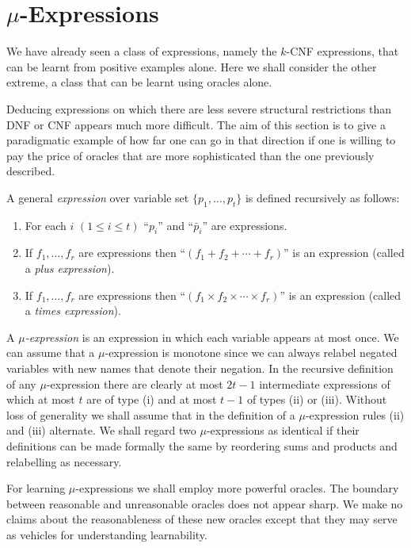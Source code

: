 \section{$\mu$-Expressions}

We have already seen a class of expressions, namely the $k$-CNF expressions, that can be learnt from positive examples alone. Here we shall consider the other extreme, a class that can be learnt using oracles alone.

Deducing expressions on which there are less severe structural restrictions than DNF or CNF appears much more difficult. The aim of this section is to give a paradigmatic example of how far one can go in that direction if one is willing to pay the price of oracles that are more sophisticated than the one previously described.

A general \emph{expression} over variable set $\{p_1, \ldots, p_t\}$ is defined recursively as follows:

\begin{enumerate}
    \item[(i)] For each $i$ $(1 \leq i \leq t)$ ``$p_i$'' and ``$\bar{p}_i$'' are expressions.

    \item[(ii)] If $f_1, \ldots, f_r$ are expressions then ``$(f_1 + f_2 + \cdots + f_r)$'' is an expression (called a \emph{plus expression}).

    \item[(iii)] If $f_1, \ldots, f_r$ are expressions then ``$(f_1 \times f_2 \times \cdots \times f_r)$'' is an expression (called a \emph{times expression}).
\end{enumerate}

A \emph{$\mu$-expression} is an expression in which each variable appears at most once. We can assume that a $\mu$-expression is monotone since we can always relabel negated variables with new names that denote their negation. In the recursive definition of any $\mu$-expression there are clearly at most $2t - 1$ intermediate expressions of which at most $t$ are of type (i) and at most $t - 1$ of types (ii) or (iii). Without loss of generality we shall assume that in the definition of a $\mu$-expression rules (ii) and (iii) alternate. We shall regard two $\mu$-expressions as identical if their definitions can be made formally the same by reordering sums and products and relabelling as necessary.

For learning $\mu$-expressions we shall employ more powerful oracles. The boundary between reasonable and unreasonable oracles does not appear sharp. We make no claims about the reasonableness of these new oracles except that they may serve as vehicles for understanding learnability.

